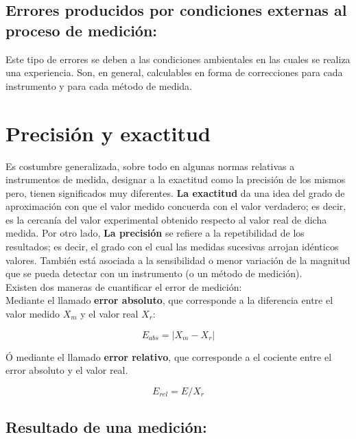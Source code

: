 \subsection{Errores producidos por condiciones externas al proceso de medición:}  

Este tipo de  errores  se deben a las condiciones ambientales en las cuales se realiza una experiencia.  Son, en general, 
calculables en forma de correcciones para cada instrumento y para cada método de medida.  


\section{Precisión y exactitud}

Es costumbre generalizada, sobre todo en algunas normas relativas a instrumentos de medida, designar a la exactitud como la 
precisión de los mismos pero, tienen significados muy diferentes. \textbf{La exactitud} da una idea del grado de aproximación con 
que el valor medido concuerda con el valor  verdadero;  es decir, es la cercanía del valor experimental obtenido respecto al 
valor real de dicha medida. Por otro lado, \textbf{La precisión} se refiere a la repetibilidad de los resultados; es decir, el  
grado con el cual las medidas sucesivas arrojan idénticos valores. También está asociada a la sensibilidad o menor variación 
de la magnitud que se pueda detectar con un instrumento (o un método de medición).\\

Existen dos maneras de cuantificar el error de medición:\\

Mediante el llamado \textbf{error absoluto}, que corresponde a la diferencia entre el valor medido $X_m$ y el valor real $X_r$:

\begin{equation}
 E_{abs} = |X_m - X_r |
\end{equation}

Ó mediante  el  llamado \textbf{error  relativo},  que  corresponde  a  el  cociente  entre  el  error  absoluto  y  el valor 
real.

\begin{equation}
 E_{rel} =  E/X_r
 \end{equation}

\subsection{Resultado de una medición:}

